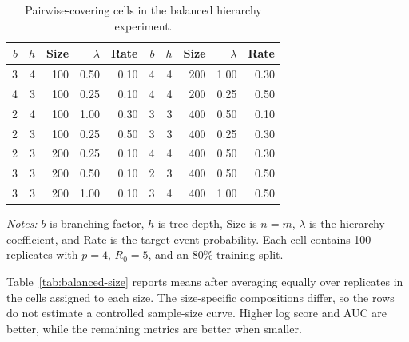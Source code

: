 \documentclass[
  12pt]{article}
\newcommand{\TableNote}[1]{%
  \par\vspace{0.35em}\noindent
  \begin{minipage}{0.96\linewidth}
    \footnotesize\setstretch{1.05}\raggedright
    \textit{Notes:} #1
  \end{minipage}%
  \par\vspace{0.6\baselineskip}%
}
\theoremstyle{definition}
\theoremstyle{plain}
\begin{document}
\begin{table}[H]
	\centering
	\small
	\caption{Pairwise-covering cells in the balanced hierarchy experiment.}
	\label{tab:balanced-design}
	\begin{tabular}{rrrr@{\hspace{1.2em}}r@{\hspace{2.4em}}rrrr@{\hspace{1.2em}}r}
		\toprule
		$b$ & $h$ & Size & $\lambda$ & Rate & $b$ & $h$ & Size & $\lambda$ & Rate \\
		\midrule
		3 & 4 & 100 & 0.50 & 0.10 & 4 & 4 & 200 & 1.00 & 0.30 \\
		4 & 3 & 100 & 0.25 & 0.10 & 4 & 4 & 200 & 0.25 & 0.50 \\
		2 & 4 & 100 & 1.00 & 0.30 & 3 & 3 & 400 & 0.50 & 0.10 \\
		2 & 3 & 100 & 0.25 & 0.50 & 3 & 3 & 400 & 0.25 & 0.30 \\
		2 & 3 & 200 & 0.25 & 0.10 & 4 & 4 & 400 & 0.50 & 0.30 \\
		3 & 3 & 200 & 0.50 & 0.10 & 2 & 3 & 400 & 0.50 & 0.50 \\
		3 & 3 & 200 & 1.00 & 0.10 & 3 & 4 & 400 & 1.00 & 0.50 \\
		\bottomrule
	\end{tabular}
	\TableNote{$b$ is branching factor, $h$ is tree depth, Size is $n=m$, $\lambda$ is the hierarchy coefficient, and Rate is the target event probability. Each cell contains 100 replicates with $p=4$, $R_0=5$, and an 80\% training split.}
\end{table}

Table~\ref{tab:balanced-size} reports means after averaging equally over replicates in the cells assigned to each size. The size-specific compositions differ, so the rows do not estimate a controlled sample-size curve. Higher log score and AUC are better, while the remaining metrics are better when smaller.
\end{document}
